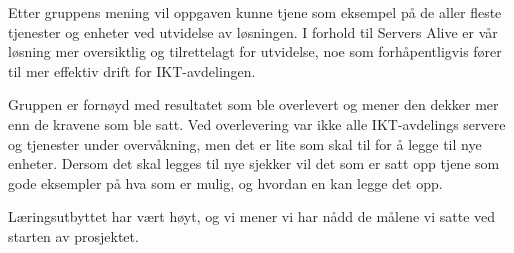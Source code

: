 Etter gruppens mening vil oppgaven kunne tjene som eksempel på de aller fleste tjenester og enheter ved utvidelse av løsningen. I forhold til Servers Alive er vår løsning mer oversiktlig og tilrettelagt for utvidelse, noe som forhåpentligvis fører til mer effektiv drift for IKT-avdelingen.

Gruppen er fornøyd med resultatet som ble overlevert og mener den dekker mer enn de kravene som ble satt. Ved overlevering var ikke alle IKT-avdelings servere og tjenester under overvåkning, men det er lite som skal til for å legge til nye enheter. Dersom det skal legges til nye sjekker vil det som er satt opp tjene som gode eksempler på hva som er mulig, og hvordan en kan legge det opp.

Læringsutbyttet har vært høyt, og vi mener vi har nådd de målene vi satte ved starten av prosjektet. 
